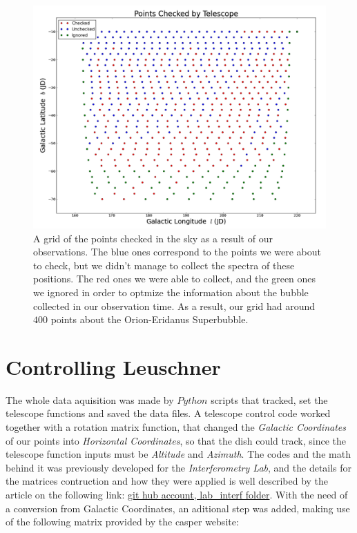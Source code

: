 \documentclass{article}
\begin{document}
\begin{figure}[H]
\center
\includegraphics[scale=0.5]{grid.png}
\caption {A grid of the points checked in the sky as a result of our observations. The blue ones correspond
to the points we were about to check, but we didn't manage to collect the spectra of these positions. The
red ones we were able to collect, and the green ones we ignored in order to optmize the information about
the bubble collected in our observation time. As a result, our grid had around $400$ points about
the Orion-Eridanus Superbubble.} 
\label{Fig:1}
\end{figure}


\section{Controlling Leuschner}

The whole data aquisition was made by $Python$ scripts that tracked, set the telescope functions and
saved the data files. A telescope control code worked together with a rotation matrix function,
that changed the \emph{Galactic Coordinates} of our points into \emph{Horizontal Coordinates}, so that the
dish could track, since the telescope function inputs must be \emph{Altitude} and \emph{Azimuth}. The codes and
the math behind it was previously developed for the \emph{Interferometry Lab}, and the details for the
matrices contruction and how they were applied is well described by the article on the following link:
\href{https://github.com/leosattler/ugradio/tree/master/lab_interf}{git hub account, lab\_interf folder}. With the
need of a conversion from Galactic Coordinates, an aditional step was added, making use of the following
matrix provided by the casper website:
\end{document}

